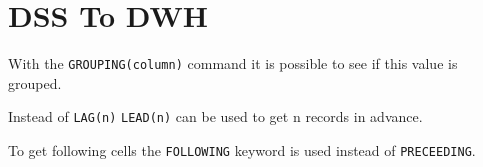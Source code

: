 
\section{DSS To DWH}

\begin{breakbox}
With the \lstinline{GROUPING(column)} command it is possible
to see if this value is grouped.
\end{breakbox}

\begin{breakbox}
\end{breakbox}

\begin{breakbox}
Instead of  \lstinline{LAG(n)} \lstinline{LEAD(n)} can be used to get n records
in advance.
\end{breakbox}

\begin{breakbox}
\end{breakbox}

\begin{breakbox}
To get following cells the \lstinline{FOLLOWING} keyword is used instead of
\lstinline{PRECEEDING}.
\end{breakbox}



